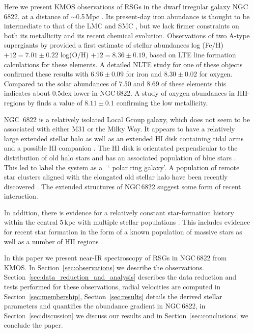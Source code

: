 \documentclass[iop]{emulateapj}
\def\2{\footnotesize II\normalsize}
\def\1{\footnotesize I\normalsize}
\begin{document}
Here we present KMOS observations of RSGs in the dwarf irregular galaxy NGC\,6822,
at a distance of $\sim$0.5\,Mpc
\cite[see e.g.][]{2003ApJ...588L..85C,2004AJ....128.2815P,2005A&A...429..837C,2012MNRAS.421.2998F}.
Its present-day iron abundance is thought to be intermediate to that of the LMC and SMC
\citep{2013ApJ...779..102K},
but we lack firmer constraints on both its metallicity and its recent chemical evolution.
Observations of two A-type supergiants by
\cite{2001ApJ...547..765V} provided a first estimate of stellar abundances
log (Fe/H) $+12=7.01\pm0.22$
log(O/H)   $+12=8.36\pm0.19$, based on LTE line formation calculations for these elements.
A detailed NLTE study
\citep{Przybilla} for one of these objects confirmed these results with
$6.96\pm 0.09$ for iron and $8.30\pm0.02$ for oxygen.
Compared to the solar abundances of 7.50 and 8.69 of these elements
\citep{2009ARA&A..47..481A} this indicates about 0.5dex lower in NGC\,6822.
A study of oxygen abundances in HII-regions by 
\citep{2006ApJ...642..813L} finds a value of $8.11\pm0.1$ confirming the low metallicity.


NGC\, 6822 is a relatively isolated Local Group galaxy, which does not seem to be associated with either M31 or the Milky Way.
It appears to have a relatively large extended stellar halo
\citep{2002AJ....123..832L,2014ApJ...783...49H} 
as well as an extended H\1 disk containing tidal arms and a possible H\1 companion
\citep{2000ApJ...537L..95D}.
The H\1 disk is orientated perpendicular to the distribution of old halo stars and has an associated population of blue stars 
\citep{2003MNRAS.341L..39D,2003ApJ...590L..17K}.
This led \cite{2006ApJ...636L..85D} to label the system as a
~\textquoteleft
polar ring galaxy\textquoteright.
A population of remote star clusters aligned with the elongated old stellar halo have been recently discovered
\citep{2011ApJ...738...58H,2013MNRAS.429.1039H}.
The extended structures of NGC\,6822 suggest some form of recent interaction.

In addition, there is evidence for a relatively constant star-formation history within the central 5\,kpc
\citep{2014ApJ...789..147W}
with multiple stellar populations
\citep{2006A&A...451...99B,2012A&A...540A.135S}.
This includes evidence for recent star formation in the form of a known population of massive stars as well as a number of H\2 regions
\citep{2001ApJ...547..765V,2006AJ....131..343D,2009A&A...505.1027H,Levesque12}.

In this paper we present near-IR spectroscopy of RSGs in NGC\,6822 from KMOS.
In Section~\ref{sec:observations} we describe the observations.
Section~\ref{sec:data_reduction_and_analysis} describes the data reduction and tests performed for these observations, 
radial velocities are computed in Section~\ref{sec:membership},
Section~\ref{sec:results} details the derived stellar parameters and quantifies the abundance gradient in NGC\,6822, in Section~\ref{sec:discussion} we discuss our results and in
Section~\ref{sec:conclusions} we conclude the paper.
\end{document}
